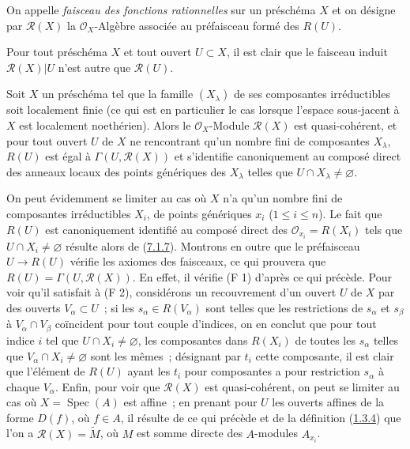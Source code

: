 \begin{definition}[7.3.2]
\label{I.7.3.2-fr}
On appelle \emph{faisceau des fonctions rationnelles} sur un préschéma $X$
et on désigne par $\mathscr{R}(X)$ la $\mathscr{O}_X$-Algèbre associée au
préfaisceau formé des $R(U)$.
\end{definition}

Pour tout préschéma $X$ et tout ouvert $U\subset X$, il est clair que le
faisceau induit $\mathscr{R}(X)|U$ n'est autre que $\mathscr{R}(U)$.

\begin{proposition}[7.3.3]
\label{I.7.3.3-fr}
Soit $X$ un préschéma tel que la famille $(X_\lambda)$ de ses composantes
irréductibles soit localement finie (ce qui est en particulier le cas lorsque
l'espace sous-jacent à $X$ est localement noethérien). Alors le
$\mathscr{O}_X$-Module $\mathscr{R}(X)$ est quasi-cohérent, et pour tout
ouvert $U$ de $X$ ne rencontrant qu'un nombre fini de composantes $X_\lambda$,
$R(U)$ est égal à $\Gamma(U,\mathscr{R}(X))$ et s'identifie canoniquement au
composé direct des anneaux locaux des points génériques des $X_\lambda$ telles
que $U\cap X_\lambda\neq\varnothing$.
\end{proposition}

On peut évidemment se limiter au cas où $X$ n'a qu'un nombre fini de
composantes irréductibles $X_i$, de points génériques $x_i$
($1\leq i\leq n$). Le fait que $R(U)$ est canoniquement identifié au composé
direct des $\mathscr{O}_{x_i}=R(X_i)$ tels que
$U\cap X_i\neq\varnothing$ résulte alors de
(\hyperref[I.7.1.7-fr]{7.1.7}). Montrons en outre que le préfaisceau
$U\to R(U)$ vérifie les axiomes des faisceaux, ce qui prouvera que
$R(U)=\Gamma(U,\mathscr{R}(X))$. En effet, il vérifie (F 1) d'après ce qui
précède. Pour voir qu'il satisfait à (F 2), considérons un recouvrement d'un
ouvert $U$ de $X$ par des ouverts $V_\alpha\subset U$~; si les
$s_\alpha\in R(V_\alpha)$ sont telles que les restrictions de $s_\alpha$ et
$s_\beta$ à $V_\alpha\cap V_\beta$ coïncident pour tout couple d'indices, on
en conclut que pour tout indice $i$ tel que $U\cap X_i\neq\varnothing$, les
composantes dans $R(X_i)$ de toutes les $s_\alpha$ telles que
$V_\alpha\cap X_i\neq\varnothing$ sont les mêmes~; désignant par $t_i$ cette
composante, il est clair que l'élément de $R(U)$ ayant les $t_i$ pour
composantes a pour restriction $s_\alpha$ à chaque $V_\alpha$. Enfin, pour
voir que $\mathscr{R}(X)$ est quasi-cohérent, on peut se limiter au cas où
$X=\operatorname{Spec}(A)$ est affine~; en prenant pour $U$ les ouverts
affines de la forme $D(f)$, où $f\in A$, il résulte de ce qui précède et de la
définition (\hyperref[I.1.3.4-fr]{1.3.4}) que l'on a
$\mathscr{R}(X)=\widetilde M$, où $M$ est somme directe des $A$-modules
$A_{x_i}$.

